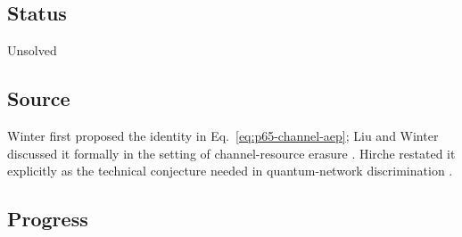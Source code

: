 \subsection*{Status}

Unsolved

\subsection*{Source}

Winter first proposed the identity in Eq.~\eqref{eq:p65-channel-aep}; Liu and
Winter discussed it formally in the setting of channel-resource erasure
.  Hirche restated it explicitly as the
technical conjecture needed in quantum-network discrimination
.

\subsection*{Progress}

